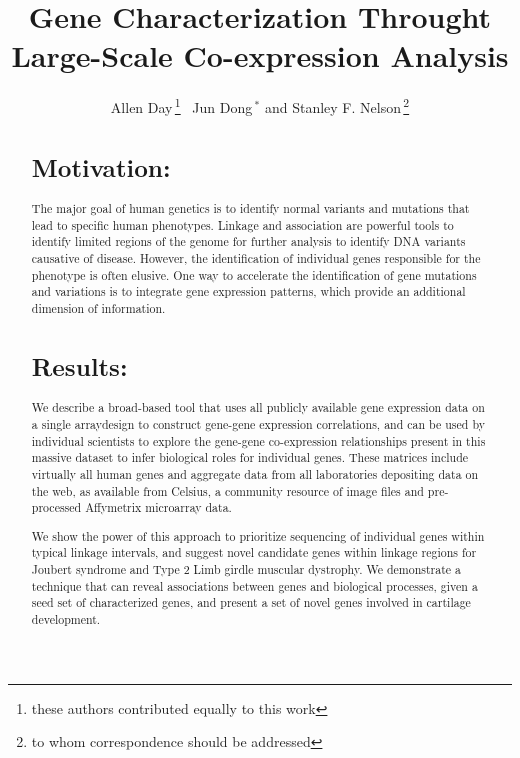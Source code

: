 \documentclass{bioinfo}
\begin{document}

\title[Co-expression Analysis]{Gene Characterization Throught Large-Scale Co-expression Analysis}
\author[Day \textit{et~al}]{Allen Day\,\footnote{these authors contributed equally to this work}~ Jun Dong\,$^{*}$ and Stanley F. Nelson\,\footnote{to whom correspondence should be addressed}}
\address{Department of Human Genetics, David Geffen School of Medicine, University of California, Los Angeles.}
\maketitle

\begin{abstract}


\section{Motivation:}
The major goal of human genetics is to identify normal variants and mutations
that lead to specific human phenotypes.  Linkage and association are powerful
tools to identify limited regions of the genome for further analysis to
identify DNA variants causative of disease.  However, the identification of
individual genes responsible for the phenotype is often elusive.  One way to
accelerate the identification of gene mutations and variations is to integrate
gene expression patterns, which provide an additional dimension of information.

\section{Results:}
We describe a broad-based tool that uses all publicly available gene expression
data on a single arraydesign to construct gene-gene expression correlations, and
can be used by individual scientists to explore the gene-gene co-expression
relationships present in this massive dataset to infer biological roles for
individual genes.  These matrices include virtually all human genes and
aggregate data from all laboratories depositing data on the web, as available
from Celsius, a community resource of image files and pre-processed Affymetrix
microarray data.

We show the power of this approach to prioritize sequencing of individual genes
within typical linkage intervals, and suggest novel candidate genes within
linkage regions for Joubert syndrome and Type 2 Limb girdle muscular dystrophy.
We demonstrate a technique that can reveal associations between genes and
biological processes, given a seed set of characterized genes, and present a
set of novel genes involved in cartilage development.


\end{abstract}
\end{document}
